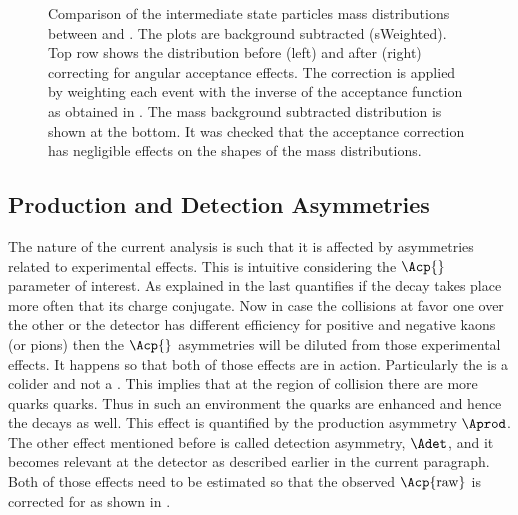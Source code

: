 \begin{figure}[h]
  \centering
  \begin{subfigure}{0.5\textwidth}
    \scalebox{0.65}{}
    \caption{}
    \label{mkpiPlot_raw}
  \end{subfigure}%
  \hfill%
  \begin{subfigure}{0.5\textwidth}
    \scalebox{0.65}{}
    \caption{}
    \label{mkpiPlot_eff}
  \end{subfigure}
  \begin{subfigure}{0.5\textwidth}
    \scalebox{0.65}{}
    \caption{}
    \label{jpsiPlot}
  \end{subfigure}
\caption{Comparison of the intermediate state particles mass distributions between \Bs and \Bd.
         The plots are background subtracted (sWeighted). Top row shows the \mkpi distribution before (left)
         and after (right) correcting for angular acceptance effects. The correction is applied by weighting
          each event with the inverse of the acceptance function as obtained in .
         The \Jpsi mass background subtracted distribution is shown at the bottom. It was checked that the
         acceptance correction has negligible effects on the shapes of the \Jpsi mass distributions. }

\end{figure}

\subsection{Production and Detection Asymmetries}
\label{experimentalAssym}
The nature of the current analysis is such that it is affected by asymmetries related to experimental effects.
This is intuitive considering the $\Acp{}$ parameter of interest. As explained in 
the last quantifies if the decay \BsJpsiKst takes place more often that its charge conjugate. Now in case the
collisions at \lhc favor one over the other or the detector has different efficiency for positive and negative
kaons (or pions) then the $\Acp{}$ asymmetries will be diluted from those experimental effects. It happens so that
both of those effects are in action. Particularly the \lhc is a \proton\proton colider and not a \proton\antiproton .
This implies that at the region of collision there are more \bquark quarks \bquarkbar quarks.
Thus in such an environment the \bquark quarks are enhanced and hence the \BsbarJpsiKst
decays as well. This effect is quantified by the production asymmetry $\Aprod$. The other effect mentioned before
is called detection asymmetry, $\Adet$, and it becomes relevant at the \lhcb detector as described earlier in the
current paragraph. Both of those effects need to be estimated so that the observed $\Acp{\rm raw}$ is corrected for
as shown in .

